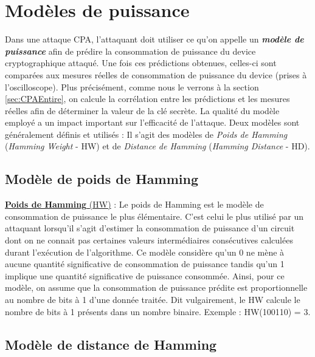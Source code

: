 \documentclass[oneside]{book}
\begin{document}
\section{Modèles de puissance}
\label{sec:modelpuissance}
\vspace{-0.1 cm}Dans une attaque CPA, l'attaquant doit utiliser ce qu'on appelle un \textbf{\textit{modèle de puissance}} afin de prédire la consommation de puissance du device cryptographique attaqué. Une fois ces prédictions obtenues, celles-ci sont comparées aux mesures réelles de consommation de puissance du device (prises à l'oscilloscope). Plus précisément, comme nous le verrons à la section \ref{sec:CPAEntire}, on calcule la corrélation entre les prédictions et les mesures réelles afin de déterminer la valeur de la clé secrète. La qualité du modèle employé a un impact important sur l'efficacité de l'attaque. Deux modèles sont généralement définis et utilisés : Il s'agit des modèles de \textit{Poids de Hamming} (\textit{Hamming Weight} - HW) et de \textit{Distance de Hamming} (\textit{Hamming Distance} - HD).


\subsection{Modèle de poids de Hamming}
\label{sec:modelHW}

\underline{\textbf{Poids de Hamming} (HW)} : Le poids de Hamming est le modèle de consommation de puissance le plus élémentaire. C'est celui le plus utilisé par un attaquant lorsqu'il s'agit d'estimer la consommation de puissance d'un circuit dont on ne connait pas certaines valeurs intermédiaires consécutives calculées durant l'exécution de l'algorithme. Ce modèle considère qu'un 0 ne mène à aucune quantité significative de consommation de puissance tandis qu'un 1 implique une quantité significative de puissance consommée. Ainsi, pour ce modèle, on assume que la consommation de puissance prédite est proportionnelle au nombre de bits à 1 d'une donnée traitée. Dit vulgairement, le HW calcule le nombre de bits à 1 présents dans un nombre binaire. Exemple : HW(100110) = 3.

\subsection{Modèle de distance de Hamming}
\label{sec:modelHD}
\end{document}
